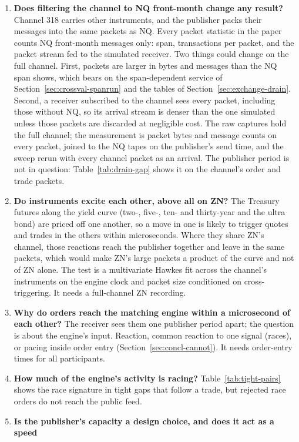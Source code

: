\documentclass[11pt]{article}
\begin{document}
\begin{enumerate}
    \item \textbf{Does filtering the channel to NQ front-month change any result?}
Channel 318 carries other instruments, and the publisher packs their messages into the
same packets as NQ. Every packet statistic in the paper counts NQ front-month messages
only: span, transactions per packet, and the packet stream fed to the simulated receiver.
Two things could change on the full channel. First, packets are larger in bytes and
messages than the NQ span shows, which bears on the span-dependent service of
Section~\ref{sec:crossval-spanrun} and the tables of Section~\ref{sec:exchange-drain}.
Second, a receiver subscribed to the channel sees every packet, including those without
NQ, so its arrival stream is denser than the one simulated unless those packets are
discarded at negligible cost. The raw captures hold the full channel; the measurement
is packet bytes and message counts on every packet, joined to the NQ tapes on the
publisher's send time, and the sweep rerun with every channel packet as an arrival. The
publisher period is not in question: Table~\ref{tab:drain-gap} shows it on the channel's order
and trade packets.
    \item \textbf{Do instruments excite each other, above all on ZN?} The Treasury futures
along the yield curve (two-, five-, ten- and thirty-year and the ultra bond) are priced
off one another, so a move in one is likely to trigger quotes and trades in the others
within microseconds. Where they share ZN's channel, those reactions reach the publisher
together and leave in the same packets, which would make ZN's large packets a product of
the curve and not of ZN alone. The test is a multivariate Hawkes fit across the channel's
instruments on the engine clock and packet size conditioned on cross-triggering. It needs
a full-channel ZN recording.
    \item \textbf{Why do orders reach the matching engine within a microsecond of each
other?} The receiver sees them one publisher period apart; the
question is about the engine's input. Reaction,
common reaction to one signal (races), or pacing inside order entry
(Section~\ref{sec:concl-cannot}). It needs order-entry times for all participants.
    \item \textbf{How much of the engine's activity is racing?} Table~\ref{tab:tight-pairs}
shows the race signature in tight gaps that follow a trade, but rejected race orders do not reach
the public feed.
    \item \textbf{Is the publisher's capacity a design choice, and does it act as a speed
}
\end{enumerate}
\end{document}
